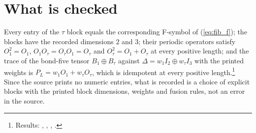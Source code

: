 \documentclass{article}
\begin{document}
\section{What is checked}
Every entry of the $\tau$ block equals the corresponding F-symbol of
(\ref{eq:fib_f}); the blocks have the recorded dimensions $2$ and $3$; their
periodic operators satisfy $O_1^2=O_1$, $O_1O_\tau=O_\tau O_1=O_\tau$ and
$O_\tau^2=O_1+O_\tau$ at every positive length; and
the trace of the bond-five tensor $B_1\oplus B_\tau$ against
$\Delta=w_1 I_2\oplus w_\tau I_3$ with the printed weights is
$P_L=w_1O_1+w_\tau O_\tau$, which is idempotent at every positive length.\footnote{Results:
    ,
    ,
    ,
    .}
Since the source prints no numeric entries, what is recorded is a choice of
explicit blocks with the printed block dimensions, weights and fusion rules,
not an error in the source.
\end{document}
